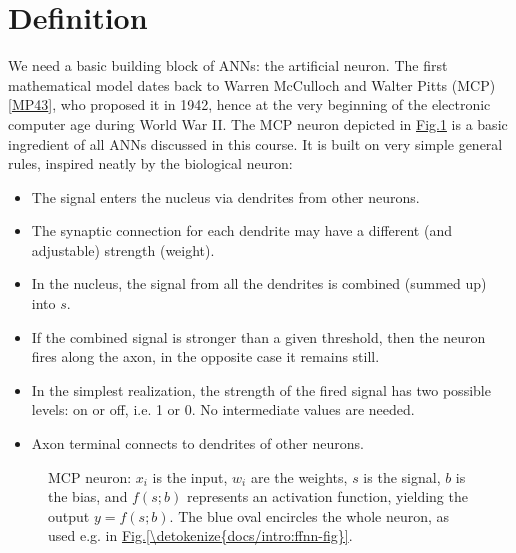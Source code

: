 \documentclass[letterpaper,10pt,english]{jupyterBook}
\let\sphinxpxdimen\pdfpxdimen\else\newdimen\sphinxpxdimen
\begin{document}
\section{Definition}
\label{\detokenize{docs/mcp:definition}}
\sphinxAtStartPar
We need a basic building block of ANNs: the artificial neuron. The first mathematical model dates back to Warren McCulloch and Walter Pitts (MCP){[}\hyperlink{cite.docs/conclusion:id9}{MP43}{]}, who proposed it in 1942, hence at the very beginning of the electronic computer age during World War II. The MCP neuron depicted in \hyperref[\detokenize{docs/mcp:mcp1-fig}]{Fig.\@ \ref{\detokenize{docs/mcp:mcp1-fig}}} is a basic ingredient of all ANNs discussed in this course. It is built on very simple general rules, inspired neatly by the biological neuron:
\begin{itemize}
\item {} 
\sphinxAtStartPar
The signal enters the nucleus via dendrites from other neurons.

\item {} 
\sphinxAtStartPar
The synaptic connection for each dendrite may have a different (and adjustable) strength (weight).

\item {} 
\sphinxAtStartPar
In the nucleus, the signal from all the dendrites is combined (summed up) into \(s\).

\item {} 
\sphinxAtStartPar
If the combined signal is stronger than a given threshold, then the neuron fires along the axon, in the opposite case it remains still.

\item {} 
\sphinxAtStartPar
In the simplest realization, the strength of the fired signal has two possible levels: on or off, i.e. 1 or 0. No intermediate values are needed.

\item {} 
\sphinxAtStartPar
Axon terminal connects to dendrites of other neurons.

\end{itemize}

\begin{figure}[htbp]
\centering
\capstart

\noindent\sphinxincludegraphics[width=320\sphinxpxdimen]{{mcp-1a}.png}
\caption{MCP neuron: \(x_i\) is the input, \(w_i\) are the weights, \(s\) is the signal, \(b\) is the bias, and \(f(s;b)\) represents an activation function, yielding the output \(y=f(s;b)\). The blue oval encircles the whole neuron, as used e.g. in \hyperref[\detokenize{docs/intro:ffnn-fig}]{Fig.\@ \ref{\detokenize{docs/intro:ffnn-fig}}}.}\label{\detokenize{docs/mcp:mcp1-fig}}\end{figure}
\end{document}
